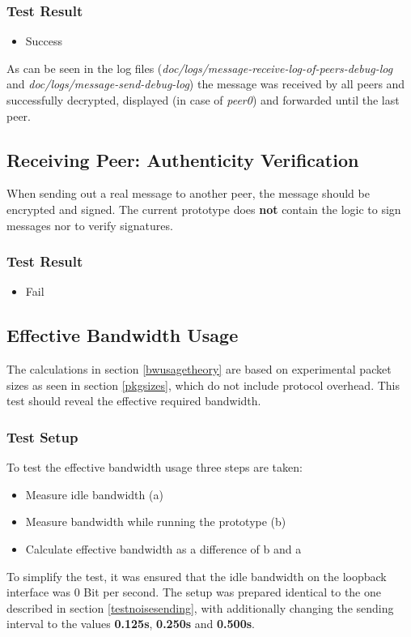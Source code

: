 \subsubsection{Test Result}
\begin{itemize}
\item Success
\end{itemize}
As can be seen in the log files
(\textit{doc/logs/message-receive-log-of-peers-debug-log} and
\textit{doc/logs/message-send-debug-log})
the message was received by all peers and successfully decrypted,
displayed (in case of \textit{peer0}) and forwarded until the last
peer.
\subsection{Receiving Peer: Authenticity Verification}
When sending out a real message to another peer, the message should be
encrypted and signed. 
The current prototype does \textbf{not} contain
the logic to sign messages nor to verify signatures.
\subsubsection{Test Result}
\begin{itemize}
\item Fail
\end{itemize}
\subsection{Effective Bandwidth Usage}
The calculations in section \ref{bwusagetheory} are based on experimental
packet sizes as seen in section \ref{pkgsizes}, which do not include
protocol overhead. This test should reveal the effective required
bandwidth.
\subsubsection{Test Setup}
To test the effective bandwidth usage three steps are taken:
\begin{itemize}
\item Measure idle bandwidth (a)
\item Measure bandwidth while running the prototype (b)
\item Calculate effective bandwidth as a difference of b and a
\end{itemize}
To simplify the test, it was ensured that the idle bandwidth on the
loopback interface was 0 Bit per second.
The setup was prepared identical to the one described
in section \ref{testnoisesending}, with additionally changing
the sending interval to the values \textbf{0.125s},
\textbf{0.250s} and \textbf{0.500s}.
